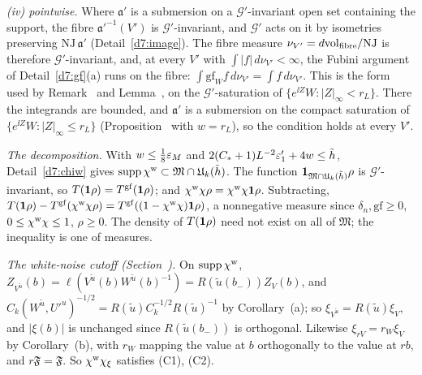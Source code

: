 \begin{detail}
\begin{step}
\emph{(iv) pointwise.} Where $\mathfrak a'$ is a submersion on a $\mathcal G'$-invariant open set containing the support, the fibre $\mathfrak a'^{-1}(V')$ is $\mathcal G'$-invariant, and $\mathcal G'$ acts on it by isometries preserving $\mathrm{NJ}\,\mathfrak a'$ (Detail~\ref{d7:image}). The fibre measure $\nu_{V'}=d\mathrm{vol}_{\rm fibre}/\mathrm{NJ}$ is therefore $\mathcal G'$-invariant, and, at every $V'$ with $\int|f|\,d\nu_{V'}<\infty$, the Fubini argument of Detail~\ref{d7:gf}(a) runs on the fibre: $\int\mathrm{gf}_Wf\,d\nu_{V'}=\int f\,d\nu_{V'}$. This is the form used by Remark~ and Lemma~, on the $\mathcal G'$-saturation of $\{e^{\ii Z}W:|Z|_\infty<r_L\}$. There the integrands are bounded, and $\mathfrak a'$ is a submersion on the compact saturation of $\{e^{\ii Z}W:|Z|_\infty\le r_L\}$ (Proposition~ with $w=r_L$), so the condition holds at every $V'$.
\end{step}
\begin{step}
\emph{The decomposition.} With $w\le\frac18\varepsilon_M$ and $2(C_*+1)L^{-2}\varepsilon'_1+4w\le\tilde h$, Detail~\ref{d7:chiw} gives $\operatorname{supp}\chi^{\rm w}\subset\mathfrak M\cap\mathfrak U_k(\tilde h)$. The function $\mathbf 1_{\mathfrak M\cap\mathfrak U_k(\tilde h)}\rho$ is $\mathcal G'$-invariant, so $T(\mathbf 1\rho)=T^{\rm gf}(\mathbf 1\rho)$; and $\chi^{\rm w}\chi\rho=\chi^{\rm w}\chi\mathbf 1\rho$. Subtracting, $T(\mathbf 1\rho)-T^{\rm gf}(\chi^{\rm w}\chi\rho)=T^{\rm gf}((1-\chi^{\rm w}\chi)\mathbf 1\rho)$, a nonnegative measure since $\delta_n,\mathrm{gf}\ge0$, $0\le\chi^{\rm w}\chi\le1$, $\rho\ge0$. The density of $T(\mathbf 1\rho)$ need not exist on all of $\mathfrak M$; the inequality is one of measures.
\end{step}
\begin{step}
\emph{The white-noise cutoff (Section~).} On $\operatorname{supp}\chi^{\rm w}$, $Z_{V^{\tilde u}}(b)=\ell(V^{\tilde u}(b)W^{\tilde u}(b)^{-1})=R(\tilde u(b_-))Z_V(b)$, and $C_k(W^{\tilde u},U'^u)^{-1/2}=R(\tilde u)C_k^{-1/2}R(\tilde u)^{-1}$ by Corollary~(a); so $\xi_{V^{\tilde u}}=R(\tilde u)\xi_V$, and $|\xi(b)|$ is unchanged since $R(\tilde u(b_-))$ is orthogonal. Likewise $\xi_{rV}=r_W\xi_V$ by Corollary~(b), with $r_W$ mapping the value at $b$ orthogonally to the value at $rb$, and $r\mathfrak F=\mathfrak F$. So $\chi^{\rm w}\chi_\xi$ satisfies (C1), (C2).
\end{step}
\end{detail}

